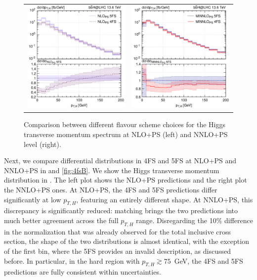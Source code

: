\documentclass[11pt,a4paper]{article}
\begin{document}
\begin{figure}[t!]
\begin{center}
\begin{tabular}{cc}
\includegraphics[width=.45\textwidth, page=1]{plots/4fs/pt_Higgs_NLO_5FS_4FS.pdf}&
\includegraphics[width=.45\textwidth, page=1]{plots/4fs/pt_Higgs_minnlops_5FS_4FS-FC.pdf}
\end{tabular}
\vspace*{1ex}
\caption{Comparison between different flavour scheme choices for the Higgs transverse momentum spectrum at NLO+PS (left) and NNLO+PS level (right). \label{fig:4fsA}}
\end{center}
\end{figure}

Next, we compare differential distributions in 4FS and 5FS at NLO+PS and NNLO+PS in  and \ref{fig:4fsB}. 
We show the Higgs transverse momentum distribution in . The left plot shows the NLO+PS predictions and the right plot the NNLO+PS ones. 
At NLO+PS, the 4FS and 5FS predictions differ significantly at low $p_{T,H}$, featuring an entirely different shape. 
At NNLO+PS, this discrepancy is significantly reduced: \minnlo{} matching brings the two predictions into much better 
agreement across the full $p_{T,H}$ range. Disregarding the 10\% difference in the normalization that was already observed for 
the total inclusive cross section, the shape of the two distributions is almost identical, with the exception of the first bin,
where the 5FS provides an invalid description, as discussed before.
In particular, in the hard region with \(p_{T,H} \gtrsim 75\)~GeV, the 4FS and 5FS predictions are fully consistent within uncertainties.
\end{document}
